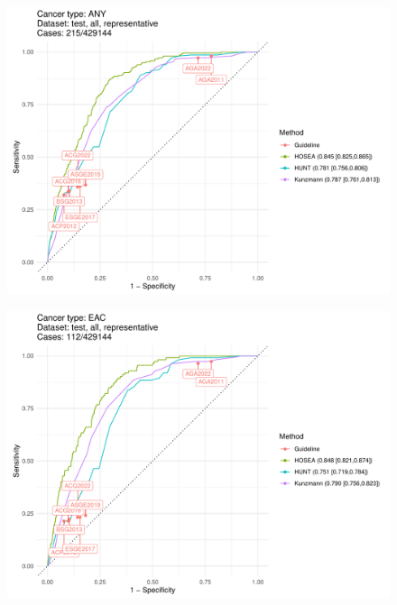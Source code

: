 \documentclass[english]{article}
\begin{document}
\begin{figure}[ht]
\includegraphics[width=1.0\linewidth]{comparison/ANY_all_representative.pdf}
\end{figure}
\begin{figure}[ht]
\includegraphics[width=1.0\linewidth]{comparison/EAC_all_representative.pdf}
\end{figure}
\end{document}
